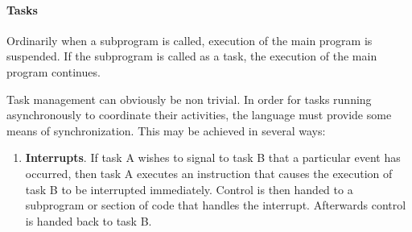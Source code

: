 \paragraph{Tasks} Ordinarily when a subprogram is called, execution of the main program is suspended. If the subprogram is called as a task, the execution of the main program continues.

Task management can obviously be non trivial. In order for tasks running asynchronously to coordinate their activities, the language must provide some means of synchronization. This may be achieved in several ways:
\begin{enumerate}
\item \textbf{Interrupts}. If task A wishes to signal to task B that a particular event has occurred, then task A executes an instruction that causes the execution of task B to be interrupted immediately. Control is then handed to a subprogram or section of code that handles the interrupt. Afterwards control is handed back to task B.


\end{enumerate}
